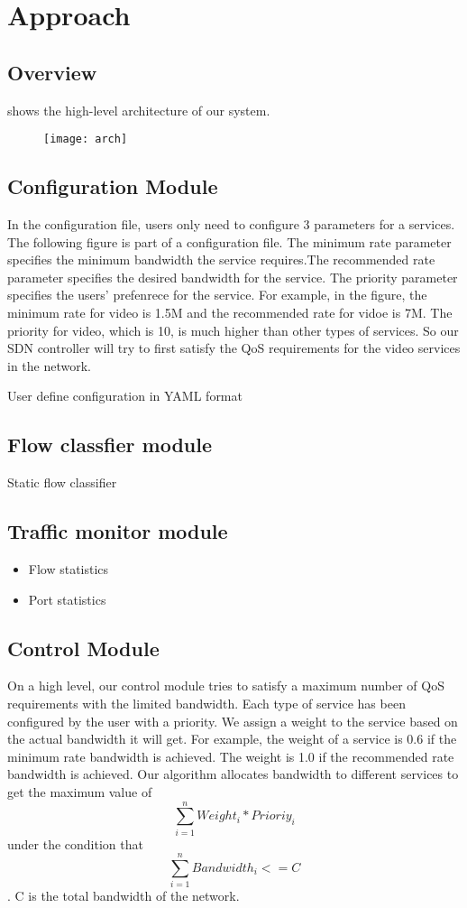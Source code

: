 \section{Approach}
\label{sect:approach}
\subsection{Overview}
 shows the high-level architecture of our system.
\begin{figure}[htb]
\centering
\texttt{[image: arch]}
\caption{}
\label{fig:architecture}
\end{figure}

\subsection{Configuration Module}
In the configuration file, users only need to configure 3 parameters for a services. The following figure is part of a configuration file.
The minimum rate parameter specifies the minimum bandwidth the service requires.The recommended rate parameter specifies the desired bandwidth for the service.
The priority parameter specifies the users' prefenrece for the service.
For example, in the figure, the minimum rate for video is 1.5M and the recommended rate for vidoe is 7M. The priority for video, which is 10, is much higher than other types of services. So our SDN controller will try to first satisfy the QoS requirements for the video services in the network.

User define configuration in YAML format
\subsection{Flow classfier module}
Static flow classifier
\subsection{Traffic monitor module}
\begin{itemize}
\item Flow statistics
\item Port statistics
\end{itemize}
\subsection{Control Module}
On a high level, our control module tries to satisfy a maximum number of QoS requirements with the limited bandwidth.
Each type of service has been configured by the user with a priority. We assign a weight to the service based on the actual bandwidth it will get. For example, the weight of a service is 0.6 if the minimum rate bandwidth is achieved. The weight is 1.0 if the recommended rate bandwidth is achieved.
Our algorithm allocates bandwidth to different services to get the maximum value of $$\sum_{i=1}^{n} Weight_i*Prioriy_i $$ under the condition that
$$\sum_{i=1}^{n} Bandwidth_i <= C $$. C is the total bandwidth of the network.


